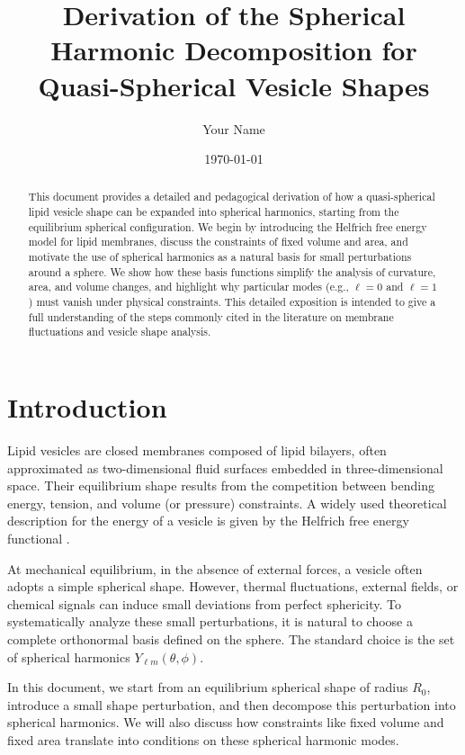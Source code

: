 \documentclass[12pt,a4paper]{article}
\title{Derivation of the Spherical Harmonic Decomposition for Quasi-Spherical Vesicle Shapes}
\author{Your Name}
\date{\today}
\begin{document}
\maketitle

\begin{abstract}
This document provides a detailed and pedagogical derivation of how a quasi-spherical lipid vesicle shape can be expanded into spherical harmonics, starting from the equilibrium spherical configuration. We begin by introducing the Helfrich free energy model for lipid membranes, discuss the constraints of fixed volume and area, and motivate the use of spherical harmonics as a natural basis for small perturbations around a sphere. We show how these basis functions simplify the analysis of curvature, area, and volume changes, and highlight why particular modes (e.g., $\ell=0$ and $\ell=1$) must vanish under physical constraints. This detailed exposition is intended to give a full understanding of the steps commonly cited in the literature on membrane fluctuations and vesicle shape analysis.
\end{abstract}

\tableofcontents

\section{Introduction}

Lipid vesicles are closed membranes composed of lipid bilayers, often approximated as two-dimensional fluid surfaces embedded in three-dimensional space. Their equilibrium shape results from the competition between bending energy, tension, and volume (or pressure) constraints. A widely used theoretical description for the energy of a vesicle is given by the Helfrich free energy functional \cite{Helfrich1973,Seifert1997,Lim2015}.

At mechanical equilibrium, in the absence of external forces, a vesicle often adopts a simple spherical shape. However, thermal fluctuations, external fields, or chemical signals can induce small deviations from perfect sphericity. To systematically analyze these small perturbations, it is natural to choose a complete orthonormal basis defined on the sphere. The standard choice is the set of spherical harmonics $Y_{\ell m}(\theta,\phi)$.

In this document, we start from an equilibrium spherical shape of radius $R_0$, introduce a small shape perturbation, and then decompose this perturbation into spherical harmonics. We will also discuss how constraints like fixed volume and fixed area translate into conditions on these spherical harmonic modes.
\end{document}
